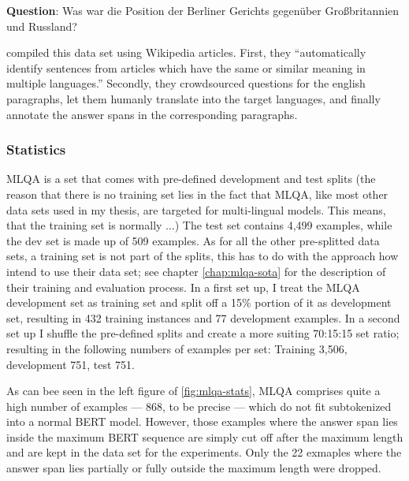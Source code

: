 \begin{examples}
        \textbf{Question}: Was war die Position der Berliner Gerichts gegenüber Großbritannien und Russland?\\
\end{examples}

\cite{lewis2019mlqa} compiled this data set using Wikipedia articles. First, they
``automatically identify sentences from \textelp{} articles which have the same or
similar meaning in multiple languages.'' Secondly, they crowdsourced questions
for the english paragraphs, let them humanly translate into the target languages,
and finally annotate the answer spans in the corresponding paragraphs.

\subsubsection{Statistics}

MLQA is a set that comes with pre-defined development and test splits {\color{red} (the
reason that there is no training set lies in the fact that MLQA, like most other data sets
used in my thesis, are targeted for multi-lingual models. This means, that the training set
is normally ...)} The test set contains 4,499 examples, while the dev set is made up of 509
examples. As for all the other pre-splitted data sets, a training set is not part of the splits,
this has to do with the approach how \cite{lewis2019mlqa} intend to use their data set; see
chapter \ref{chap:mlqa-sota} for the description of their training and evaluation process.
In a first set up, I treat the MLQA development set as training set and split off a 15\% portion of
it as development set, resulting in 432 training instances and 77 development examples.
In a second set up I shuffle the pre-defined splits and create a more suiting 70:15:15 set ratio;
resulting in the following numbers of examples per set: Training 3,506, development 751, test 751.


As can bee seen in the left figure of \ref{fig:mlqa-stats}, MLQA comprises quite a high number
of examples --- 868, to be precise --- which do not fit subtokenized into a normal BERT model.
However, those examples where the answer span lies inside the maximum BERT sequence are simply
cut off after the maximum length and are kept in the data set for the experiments. Only the 22
exmaples where the answer span lies partially or fully outside the maximum length were dropped.

